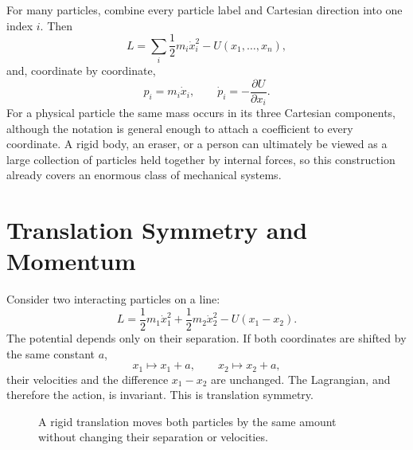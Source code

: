 For many particles, combine every particle label and Cartesian direction into
one index \(i\). Then
\begin{equation}
 L=\sum_i\frac12m_i\dot x_i^2-U(x_1,\ldots,x_n),
\end{equation}
and, coordinate by coordinate,
\begin{equation}
 p_i=m_i\dot x_i,
 \qquad
 \dot p_i=-\frac{\partial U}{\partial x_i}.
 \label{eq:l03-many-particle-newton}
\end{equation}
For a physical particle the same mass occurs in its three Cartesian
components, although the notation is general enough to attach a coefficient
to every coordinate. A rigid body, an eraser, or a person can ultimately be
viewed as a large collection of particles held together by internal forces,
so this construction already covers an enormous class of mechanical systems.

\section{Translation Symmetry and Momentum}

Consider two interacting particles on a line:
\begin{equation}
 L=
 \frac12m_1\dot x_1^2+
 \frac12m_2\dot x_2^2-
 U(x_1-x_2).
 \label{eq:l03-two-particle-lagrangian}
\end{equation}
The potential depends only on their separation. If both coordinates are
shifted by the same constant \(a\),
\begin{equation}
 x_1\longmapsto x_1+a,
 \qquad
 x_2\longmapsto x_2+a,
\end{equation}
their velocities and the difference \(x_1-x_2\) are unchanged. The
Lagrangian, and therefore the action, is invariant. This is translation
symmetry.

\begin{figure}[htbp]
\centering
{}
\caption{A rigid translation moves both particles by the same amount without
changing their separation or velocities.}
\label{fig:l03-rigid-translation}
\end{figure}

